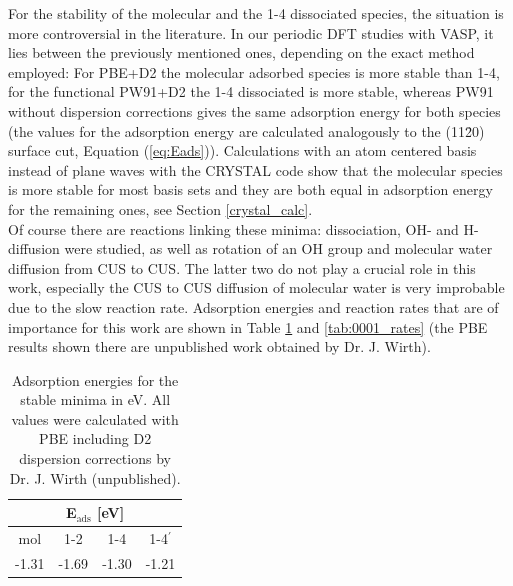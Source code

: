 \documentclass[11pt,DIV=13,BCOR=5mm,a4paper,headinclude]{scrbook}
\begin{document}
For the stability of the molecular and the 1-4 dissociated species, the situation is more controversial in the literature\cite{WirthJPCC2012,hass00,Ranea2009}.
In our periodic DFT studies with VASP, it lies between the previously mentioned ones, depending on the exact method employed: For PBE+D2 the molecular adsorbed species is more stable than 1-4, for the functional PW91+D2 the 1-4 dissociated is more stable, whereas PW91 without dispersion corrections gives the same adsorption energy for both species (the values for the adsorption energy are calculated analogously to the (11\=20) surface cut, Equation (\ref{eq:Eads})).
Calculations with an atom centered basis instead of plane waves with the CRYSTAL code show that the molecular species is more stable for most basis sets and they are both equal in adsorption energy for the remaining ones, see Section \ref{crystal_calc}.
\\
Of course there are reactions linking these minima: dissociation, OH- and H-diffusion were studied, as well as rotation of an OH group and molecular water diffusion from CUS to CUS.
The latter two do not play a crucial role in this work, especially the CUS to CUS diffusion of molecular water is very improbable due to the slow reaction rate.
Adsorption energies and reaction rates that are of importance for this work are shown in Table \ref{tab:0001_eads} and \ref{tab:0001_rates} (the PBE results shown there are unpublished work obtained by Dr. J. Wirth).
\begin{table}[!h]
  \centering
   \caption{Adsorption energies for the stable minima in eV.
All values were calculated with PBE including D2 dispersion corrections by Dr. J. Wirth (unpublished).}
  \begin{tabular}{cccc}
  \toprule
   \multicolumn{4}{c}{E$_\textrm{ads}$ [eV]}\\\midrule
  mol &1-2 &1-4 &1-4$^\prime$  \\
  -1.31 & -1.69 & -1.30 & -1.21\\\bottomrule
    \end{tabular}
  \label{tab:0001_eads}
\end{table}
\end{document}
